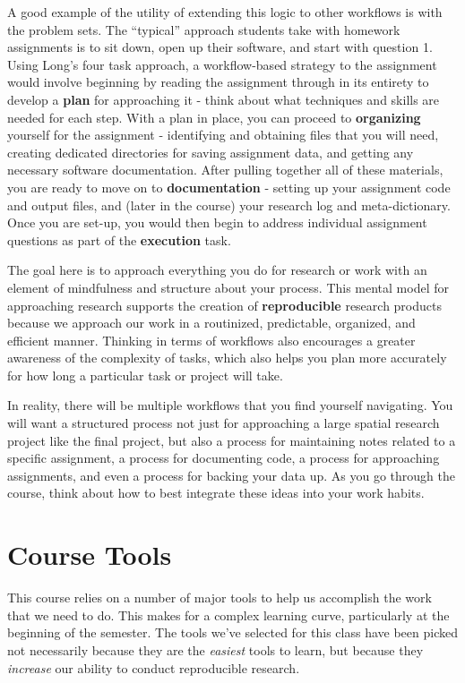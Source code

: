 \documentclass[]{book}
\theoremstyle{definition}
\theoremstyle{definition}
\theoremstyle{remark}
\begin{document}
A good example of the utility of extending this logic to other workflows
is with the problem sets. The ``typical'' approach students take with
homework assignments is to sit down, open up their software, and start
with question 1. Using Long's four task approach, a workflow-based
strategy to the assignment would involve beginning by reading the
assignment through in its entirety to develop a \textbf{plan} for
approaching it - think about what techniques and skills are needed for
each step. With a plan in place, you can proceed to \textbf{organizing}
yourself for the assignment - identifying and obtaining files that you
will need, creating dedicated directories for saving assignment data,
and getting any necessary software documentation. After pulling together
all of these materials, you are ready to move on to
\textbf{documentation} - setting up your assignment code and output
files, and (later in the course) your research log and meta-dictionary.
Once you are set-up, you would then begin to address individual
assignment questions as part of the \textbf{execution} task.

The goal here is to approach everything you do for research or work with
an element of mindfulness and structure about your process. This mental
model for approaching research supports the creation of
\textbf{reproducible} research products because we approach our work in
a routinized, predictable, organized, and efficient manner. Thinking in
terms of workflows also encourages a greater awareness of the complexity
of tasks, which also helps you plan more accurately for how long a
particular task or project will take.

In reality, there will be multiple workflows that you find yourself
navigating. You will want a structured process not just for approaching
a large spatial research project like the final project, but also a
process for maintaining notes related to a specific assignment, a
process for documenting code, a process for approaching assignments, and
even a process for backing your data up. As you go through the course,
think about how to best integrate these ideas into your work habits.

\section{Course Tools}\label{course-tools}

This course relies on a number of major tools to help us accomplish the
work that we need to do. This makes for a complex learning curve,
particularly at the beginning of the semester. The tools we've selected
for this class have been picked not necessarily because they are the
\emph{easiest} tools to learn, but because they \emph{increase} our
ability to conduct reproducible research.
\end{document}
